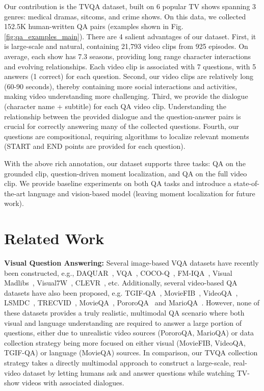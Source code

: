 \documentclass[11pt,a4paper]{article}
\begin{document}
Our contribution is the TVQA dataset, built on 6 popular TV shows spanning 3 genres: medical dramas, sitcoms, and crime shows. On this data, we collected 152.5K human-written QA pairs (examples shown in Fig.\ref{fig:qa_examples_main}).
There are 4 salient advantages of our dataset.
First, it is large-scale and natural, containing 21,793 video clips from 925 episodes. On average, each show has 7.3 seasons, providing long range character interactions and evolving relationships. 
Each video clip is associated with 7 questions, with 5 answers (1 correct) for each question.
Second, our video clips are relatively long (60-90 seconds), thereby containing more social interactions and activities, making video understanding more challenging.
Third, we provide the dialogue (character name + subtitle) for each QA video clip.
Understanding the relationship between the provided dialogue and the question-answer pairs is crucial for correctly answering many of the collected questions.
Fourth, our questions are compositional, requiring algorithms to localize relevant moments (START and END points are provided for each question).


With the above rich annotation, our dataset supports three tasks: QA on the grounded clip, question-driven moment localization, and QA on the full video clip.
We provide baseline experiments on both QA tasks and introduce a state-of-the-art language and vision-based model (leaving moment localization for future work).

 \section{Related Work}

\noindent\textbf{Visual Question Answering:}
Several image-based VQA datasets have recently been constructed, e.g., DAQUAR~\cite{malinowski2014multi}, VQA~\cite{Antol2015VQAVQ}, COCO-Q~\cite{ren2015exploring}, FM-IQA~\cite{gao2015you}, Visual Madlibs~\cite{Yu2015VisualMF}, Visual7W~\cite{zhu2016visual7w}, CLEVR~\cite{johnson2017clevr}, etc.
Additionally, several video-based QA datasets have also been proposed, e.g.
TGIF-QA~\cite{Jang2017TGIFQATS}, MovieFIB~\cite{maharaj2016dataset}, VideoQA~\cite{zhu2017uncovering}, LSMDC~\cite{rohrbach2015dataset}, TRECVID~\cite{over2014trecvid}, MovieQA~\cite{Tapaswi2016MovieQAUS}, PororoQA~\cite{Kim2017DeepStoryVS} and MarioQA~\cite{mun2017marioQA}. However, none of these datasets provides a truly realistic, multimodal QA scenario where both visual and language understanding are required to answer a large portion of questions, either due to unrealistic video sources (PororoQA, MarioQA) or data collection strategy being more focused on either visual (MovieFIB, VideoQA, TGIF-QA) or language (MovieQA) sources.
In comparison, our TVQA collection strategy takes a directly multimodal approach to construct a large-scale, real-video dataset by letting humans ask and answer questions while watching TV-show videos with associated dialogues.
\end{document}
